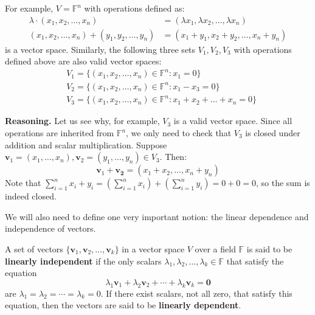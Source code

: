 \documentclass[../lecture-notes.tex]{subfiles}
\begin{document}
\begin{example}
    For example, $V = \mathbb{F}^n$ with operations defined as:
    \begin{equation*}
        \begin{aligned}
            \lambda \cdot (x_1,x_2,\dots,x_n) &= (\lambda x_1, \lambda x_2, \dots, \lambda x_n) \\
            (x_1,x_2,\dots,x_n) + (y_1,y_2,\dots,y_n) &= (x_1+y_1, x_2+y_2, \dots, x_n+y_n)
        \end{aligned}
    \end{equation*}
    is a vector space. Similarly, the following three sets $V_1,V_2,V_3$ with operations defined above are also valid vector spaces:
    \begin{equation*}
        \begin{aligned}
            &V_1 = \{(x_1,x_2,\dots,x_n) \in \mathbb{F}^n: x_1 = 0\} \\
            &V_2 = \{(x_1,x_2,\dots,x_n) \in \mathbb{F}^n: x_1-x_3 = 0\} \\
            &V_3 = \{(x_1,x_2,\dots,x_n) \in \mathbb{F}^n: x_1+x_2+\dots+x_n = 0\}
        \end{aligned}
    \end{equation*}

    \textbf{Reasoning.} Let us see why, for example, $V_3$ is a valid vector space. Since all operations 
    are inherited from $\mathbb{F}^n$, we only need to check that $V_3$ is closed under addition and scalar multiplication.
    Suppose $\mathbf{v}_1=(x_1,\dots,x_n),\mathbf{v}_2=(y_1,\dots,y_n) \in V_3$. Then:
    \begin{equation*}
        \mathbf{v}_1 + \mathbf{v_2} = (x_1+x_2,\dots,x_n+y_n)
    \end{equation*}
    Note that $\sum_{i=1}^n x_i+y_i = \left(\sum_{i=1}^n x_i\right) + \left(\sum_{i=1}^ny_i\right) = 0 + 0 = 0$, so the sum is indeed closed.
\end{example}

We will also need to define one very important notion: the linear dependence and independence of vectors.

\begin{definition}
    A set of vectors $\{\mathbf{v}_1, \mathbf{v}_2, \dots, \mathbf{v}_k\}$ in a vector space $V$ over a field $\mathbb{F}$ is said to be \textbf{linearly independent} if the only scalars $\lambda_1, \lambda_2, \dots, \lambda_k \in \mathbb{F}$ that satisfy the equation
    \begin{equation*}
        \lambda_1 \mathbf{v}_1 + \lambda_2 \mathbf{v}_2 + \cdots + \lambda_k \mathbf{v}_k = \mathbf{0}
    \end{equation*}
    are $\lambda_1 = \lambda_2 = \cdots = \lambda_k = 0$. If there exist scalars, not all zero, that satisfy this equation, then the vectors are said to be \textbf{linearly dependent}.
\end{definition}
\end{document}

